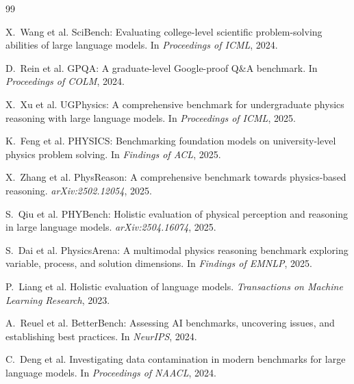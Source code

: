 \documentclass[11pt,a4paper,twocolumn]{article}
\begin{document}
\begin{thebibliography}{99}
\small
\setlength{\baselineskip}{10.4pt}
\setlength{\itemsep}{1.5pt}
\setlength{\parsep}{0pt}

X.~Wang et al.
\newblock SciBench: Evaluating college-level scientific problem-solving abilities of large language models.
\newblock In \emph{Proceedings of ICML}, 2024.

D.~Rein et al.
\newblock GPQA: A graduate-level Google-proof Q\&A benchmark.
\newblock In \emph{Proceedings of COLM}, 2024.

X.~Xu et al.
\newblock UGPhysics: A comprehensive benchmark for undergraduate physics reasoning with large language models.
\newblock In \emph{Proceedings of ICML}, 2025.

K.~Feng et al.
\newblock PHYSICS: Benchmarking foundation models on university-level physics problem solving.
\newblock In \emph{Findings of ACL}, 2025.

X.~Zhang et al.
\newblock PhysReason: A comprehensive benchmark towards physics-based reasoning.
\newblock \emph{arXiv:2502.12054}, 2025.

S.~Qiu et al.
\newblock PHYBench: Holistic evaluation of physical perception and reasoning in large language models.
\newblock \emph{arXiv:2504.16074}, 2025.

S.~Dai et al.
\newblock PhysicsArena: A multimodal physics reasoning benchmark exploring variable, process, and solution dimensions.
\newblock In \emph{Findings of EMNLP}, 2025.

P.~Liang et al.
\newblock Holistic evaluation of language models.
\newblock \emph{Transactions on Machine Learning Research}, 2023.

A.~Reuel et al.
\newblock BetterBench: Assessing AI benchmarks, uncovering issues, and establishing best practices.
\newblock In \emph{NeurIPS}, 2024.

C.~Deng et al.
\newblock Investigating data contamination in modern benchmarks for large language models.
\newblock In \emph{Proceedings of NAACL}, 2024.


\end{thebibliography}
\end{document}
